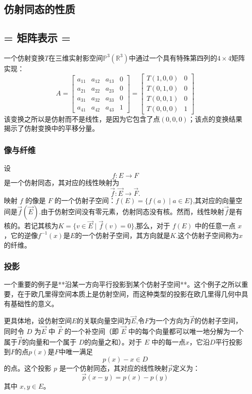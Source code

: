 \subsection{仿射同态的性质}
\subsection{= 矩阵表示 =}
一个仿射变换$T$在三维实射影空间$\mathbb{P}^3(\mathbb{R}^3)$中通过一个具有特殊第四列的$4 \times 4$矩阵实现：
$$
A =
\begin{bmatrix}
a_{11} & a_{12} & a_{13} & 0 \\
a_{21} & a_{22} & a_{23} & 0 \\
a_{31} & a_{32} & a_{33} & 0 \\
a_{41} & a_{42} & a_{43} & 1
\end{bmatrix}
=
\begin{bmatrix}
T(1,0,0) & 0 \\
T(0,1,0) & 0 \\
T(0,0,1) & 0 \\
T(0,0,0) & 1
\end{bmatrix}~
$$
该变换之所以是仿射而不是线性，是因为它包含了点$(0,0,0)$；该点的变换结果揭示了仿射变换中的平移分量。
\subsubsection{像与纤维}
设
$$
f: E \to F~
$$
是一个仿射同态，其对应的线性映射为
$$
\vec{f}: \vec{E} \to \vec{F}.~
$$
映射 $f$ 的像是 $F$ 的一个仿射子空间：$f(E) = \{ f(a) \mid a \in E \}$,其对应的向量空间是$\vec{f}(\vec{E})$.由于仿射空间没有零元素，仿射同态没有核。然而，线性映射$\vec{f}$是有核的。若记其核为$K = \{ v \in \vec{E} \mid \vec{f}(v) = 0 \}$,那么，对于 $f(E)$ 中的任意一点 $x$，它的逆像$
f^{-1}(x)$是$E$的一个仿射子空间，其方向就是$K$.这个仿射子空间称为$x$的纤维。
\subsubsection{投影}
一个重要的例子是**沿某一方向平行投影到某个仿射子空间**。这个例子之所以重要，在于欧几里得空间本质上是仿射空间，而这种类型的投影在欧几里得几何中具有基础性的意义。

更具体地，设仿射空间$E$的关联向量空间为$\vec{E}$,令$F$为一个方向为$\vec{F}$的仿射子空间，同时令 $D$ 为$\vec{E}$ 中 $\vec{F}$ 的一个补空间（即 $\vec{E}$ 中的每个向量都可以唯一地分解为一个属于$\vec{F}$的向量和一个属于 $D$的向量之和）。对于 $E$ 中的每一点$x$，它沿$D$平行投影到$F$的点$p(x)$是$F$中唯一满足
$$
p(x) - x \in D~
$$
的点。这个投影 $p$ 是一个仿射同态，其对应的线性映射$\vec{p}$定义为：
$$
\vec{p}(x - y) = p(x) - p(y)~
$$
其中 $x, y \in E$。

